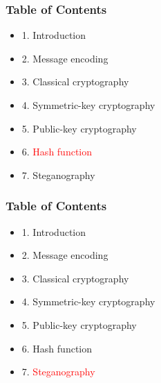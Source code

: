 \documentclass[handout, xcolor=dvipsnames,aspectratio=169]{beamer}
\begin{document}
\begin{frame}
  \centering
  \frametitle{Table of Contents}
  \begin{itemize}
    \item 1. Introduction
    \item 2. Message encoding
    \item 3. Classical cryptography
    \item 4. Symmetric-key cryptography
    \item 5. Public-key cryptography
    \item 6. \textcolor{red}{Hash function}
    \item 7. Steganography
  \end{itemize}  
\end{frame}

\begin{frame}
  \centering
  \frametitle{Table of Contents}
  \begin{itemize}
    \item 1. Introduction
    \item 2. Message encoding
    \item 3. Classical cryptography
    \item 4. Symmetric-key cryptography
    \item 5. Public-key cryptography
    \item 6. Hash function
    \item 7. \textcolor{red}{Steganography}
  \end{itemize}  
\end{frame}

\end{document}
